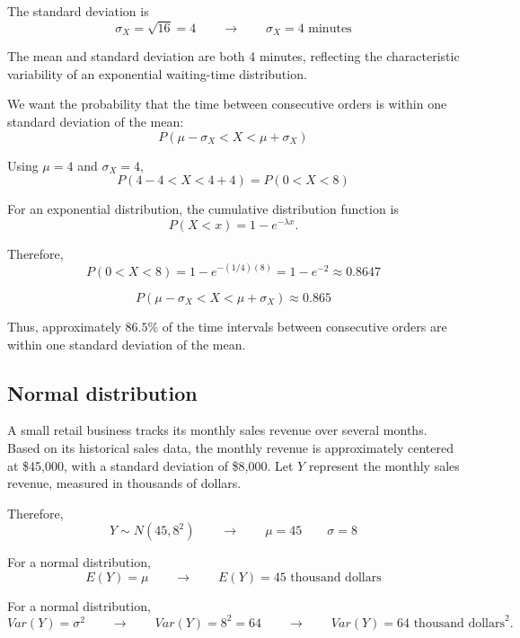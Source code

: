 The standard deviation is
\[
\sigma_X=\sqrt{16}=4
\qquad \longrightarrow \qquad
\boxed{\sigma_X=4\text{ minutes}}
\]

The mean and standard deviation are both 4 minutes, reflecting the
characteristic variability of an exponential waiting-time distribution.


We want the probability that the time between consecutive orders is
within one standard deviation of the mean:
\[
P(\mu-\sigma_X<X<\mu+\sigma_X)
\]

Using $\mu=4$ and $\sigma_X=4$,
\[
P(4-4<X<4+4)
=
P(0<X<8)
\]

For an exponential distribution, the cumulative distribution function is
\[
P(X<x)=1-e^{-\lambda x}.
\]

Therefore,
\[
P(0<X<8)
=
1-e^{-(1/4)(8)}
=
1-e^{-2}
\approx0.8647
\]

\[
\boxed{P(\mu-\sigma_X<X<\mu+\sigma_X)\approx0.865}
\]

Thus, approximately $86.5\%$ of the time intervals between consecutive
orders are within one standard deviation of the mean.


\subsection{Normal distribution}\label{sec:c4-problem-normal}


A small retail business tracks its monthly sales revenue over several
months. Based on its historical sales data, the monthly revenue is
approximately centered at \$45,000, with a standard deviation of
\$8,000. Let $Y$ represent the monthly sales revenue, measured in
thousands of dollars.

Therefore,
\[
Y\sim N(45,8^2)
\qquad \longrightarrow \qquad
\mu=45\qquad \sigma=8
\]



For a normal distribution,
\[
E(Y)=\mu
\qquad \longrightarrow \qquad
\boxed{E(Y)=45\text{ thousand dollars}}
\]


For a normal distribution,
\[
Var(Y)=\sigma^2
\qquad \longrightarrow \qquad
Var(Y)=8^2=64
\qquad \longrightarrow \qquad
\boxed{Var(Y)=64\text{ thousand dollars}^2}.
\]

